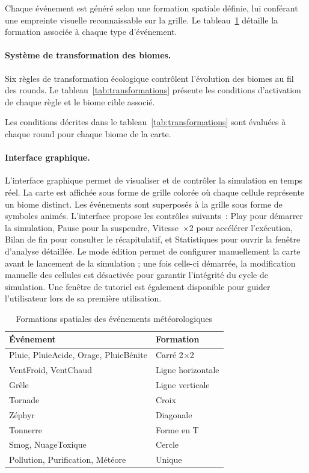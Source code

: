 Chaque événement est généré selon une formation spatiale définie, lui conférant
une empreinte visuelle reconnaissable sur la grille. Le
tableau~\ref{tab:formations} détaille la formation associée à chaque type
d'événement.

\paragraph{Système de transformation des biomes.}
Six règles de transformation écologique contrôlent l'évolution des biomes au fil
des rounds. Le tableau~\ref{tab:transformations} présente les conditions
d'activation de chaque règle et le biome cible associé.

Les conditions décrites dans le tableau~\ref{tab:transformations} sont évaluées à
chaque round pour chaque biome de la carte.

\paragraph{Interface graphique.}
L'interface graphique permet de visualiser et de contrôler la simulation en temps
réel. La carte est affichée sous forme de grille colorée où chaque cellule
représente un biome distinct. Les événements sont superposés à la grille sous forme
de symboles animés. L'interface propose les contrôles suivants~: Play pour démarrer
la simulation, Pause pour la suspendre, Vitesse~$\times 2$ pour accélérer
l'exécution, Bilan de fin pour consulter le récapitulatif, et Statistiques pour
ouvrir la fenêtre d'analyse détaillée. Le mode édition permet de configurer manuellement
la carte avant le lancement de la simulation ; une fois celle-ci démarrée, la
modification manuelle des cellules est désactivée pour garantir l'intégrité du
cycle de simulation. Une fenêtre de tutoriel
est également disponible pour guider l'utilisateur lors de sa première utilisation.

\begin{table}[htbp]
  \centering
  \begin{tabular}{ll}
    \toprule
    \textbf{Événement} & \textbf{Formation} \\
    \midrule
    Pluie, PluieAcide, Orage, PluieBénite & Carré 2$\times$2 \\
    VentFroid, VentChaud & Ligne horizontale \\
    Grêle & Ligne verticale \\
    Tornade & Croix \\
    Zéphyr & Diagonale \\
    Tonnerre & Forme en T \\
    Smog, NuageToxique & Cercle \\
    Pollution, Purification, Météore & Unique \\
    \bottomrule
  \end{tabular}
  \caption{Formations spatiales des événements météorologiques}
  \label{tab:formations}
\end{table}

